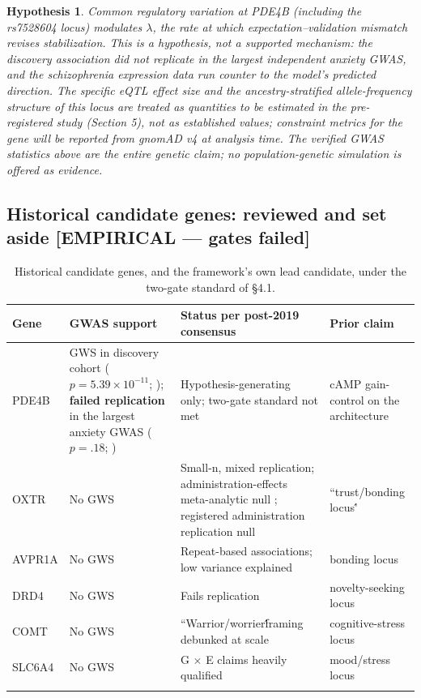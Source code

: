 \documentclass[11pt,twocolumn]{article}
\theoremstyle{plain}
\newtheorem{hypothesis}{Hypothesis}
\begin{document}
\begin{hypothesis}
Common regulatory variation at PDE4B (including the rs7528604 locus) modulates $\lambda$, the rate at which expectation–validation mismatch revises stabilization. This is a hypothesis, not a supported mechanism: the discovery association did not replicate in the largest independent anxiety GWAS, and the schizophrenia expression data run counter to the model's predicted direction. The specific eQTL effect size and the ancestry-stratified allele-frequency structure of this locus are treated as quantities to be estimated in the pre-registered study (Section 5), not as established values; constraint metrics for the gene will be reported from gnomAD v4 at analysis time. The verified GWAS statistics above are the entire genetic claim; no population-genetic simulation is offered as evidence.
\end{hypothesis}

\subsection{Historical candidate genes: reviewed and set aside [EMPIRICAL — gates failed]}

\begin{table}[t]
\centering\footnotesize
\caption{Historical candidate genes, and the framework's own lead candidate, under the two-gate standard of \S{}4.1.}
\label{tab:genes}
\begin{tabular}{@{}p{}p{}p{}p{}@{}}
\toprule
Gene & GWAS support & Status per post-2019 consensus & Prior claim \\
\midrule
PDE4B & GWS in discovery cohort ($p = 5.39 \times 10^{-11}$; \citealp{meier2019}); \textbf{failed replication} in the largest anxiety GWAS ($p = .18$; \citealp{purves2020}) & Hypothesis-generating only; two-gate standard not met & cAMP gain-control on the architecture \\
\addlinespace
OXTR & No GWS & Small-n, mixed replication; administration-effects meta-analytic null \citep{nave2015}; registered administration replication null \citep{declerck2020} & ``trust/bonding locus\'\' \\
\addlinespace
AVPR1A & No GWS & Repeat-based associations; low variance explained & bonding locus \\
\addlinespace
DRD4 & No GWS & Fails replication & novelty-seeking locus \\
\addlinespace
COMT & No GWS & ``Warrior/worrier\'\' framing debunked at scale & cognitive-stress locus \\
\addlinespace
SLC6A4 & No GWS & G $\times$ E claims heavily qualified & mood/stress locus \\
\addlinespace
\bottomrule
\end{tabular}
\end{table}
\end{document}
